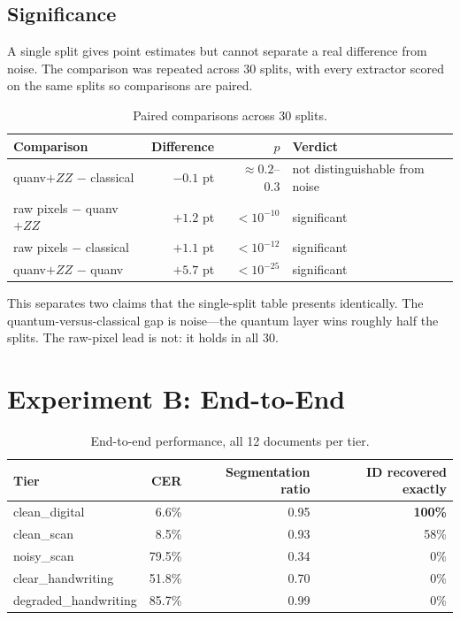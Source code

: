\documentclass[11pt,a4paper]{article}
\begin{document}
\subsection{Significance}

A single split gives point estimates but cannot separate a real difference from
noise. The comparison was repeated across 30 splits, with every extractor scored
on the same splits so comparisons are paired.

\begin{table}[h]
\centering
\caption{Paired comparisons across 30 splits.}
\small
\begin{tabular}{@{}lrrl@{}}
\toprule
Comparison & Difference & $p$ & Verdict \\
\midrule
quanv$+ZZ$ $-$ classical & $-0.1$ pt & $\approx 0.2$--$0.3$ & not distinguishable from noise \\
raw pixels $-$ quanv$+ZZ$ & $+1.2$ pt & $< 10^{-10}$ & significant \\
raw pixels $-$ classical & $+1.1$ pt & $< 10^{-12}$ & significant \\
quanv$+ZZ$ $-$ quanv & $+5.7$ pt & $< 10^{-25}$ & significant \\
\bottomrule
\end{tabular}
\end{table}


This separates two claims that the single-split table presents identically. The
quantum-versus-classical gap is noise---the quantum layer wins roughly half the
splits. The raw-pixel lead is not: it holds in all 30.

\section{Experiment B: End-to-End}

\begin{table}[h]
\centering
\caption{End-to-end performance, all 12 documents per tier.}
\begin{tabular}{@{}lrrr@{}}
\toprule
Tier & CER & Segmentation ratio & ID recovered exactly \\
\midrule
clean\_digital & 6.6\% & 0.95 & \textbf{100\%} \\
clean\_scan & 8.5\% & 0.93 & 58\% \\
noisy\_scan & 79.5\% & 0.34 & 0\% \\
clear\_handwriting & 51.8\% & 0.70 & 0\% \\
degraded\_handwriting & 85.7\% & 0.99 & 0\% \\
\bottomrule
\end{tabular}
\end{table}
\end{document}
